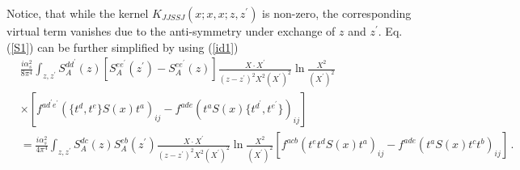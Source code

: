 \documentclass[11pt,a4paper]{article}
\begin{document}
 Notice, that while the kernel $K_{JJSSJ}(x;x,x;z,z^{\prime})$ is non-zero, the corresponding virtual term vanishes due
  to the anti-symmetry under exchange of $z$ and $z^{\prime}$.
Eq. (\ref{S1}) can be further simplified by using   (\ref{id1})
\begin{equation}\begin{split}
&\frac{i\alpha_{s}^{2}}{8\pi^{4}}\int_{z,z^{\prime}}S_{A}^{dd^{\prime}}(z)\left[S_{A}^{ee^{\prime}}(z^{\prime})-S_{A}^{ee^{\prime}}(z)\right]\frac{X\cdot X^{\prime}}{(z-z^{\prime})^{2}X^{2}(X^{\prime})^{2}}\ln\frac{X^{2}}{(X^{\prime})^{2}}\\
&\times \left[f^{ad^{\prime}e^{\prime}}(\{t^{d},t^{e}\}S(x)t^{a})_{ij}-f^{ade}(t^{a}S(x)\{t^{d^{\prime}},t^{e^{\prime}}\})_{ij}\right]\\
&=\frac{i\alpha_{s}^{2}}{4\pi^{4}}\int_{z,z^{\prime}}S_{A}^{dc}(z)S_{A}^{eb}(z^{\prime})\frac{X\cdot X^{\prime}}{(z-z^{\prime})^{2}X^{2}(X^{\prime})^{2}}\ln\frac{X^{2}}{(X^{\prime})^{2}}\left[f^{acb}(t^{e}t^{d}S(x)t^{a})_{ij}-f^{ade}(t^{a}S(x)t^{c}t^{b})_{ij}\right]\,.
 \end{split}\end{equation}
\end{document}
